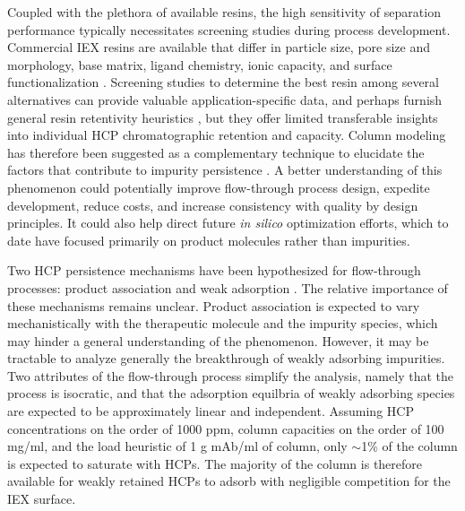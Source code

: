 \documentclass[preprint,review,12pt]{elsarticle}
\begin{document}
    Coupled with the plethora of available resins, the high sensitivity of separation performance typically necessitates screening studies during process development. Commercial IEX resins are available that differ in particle size, pore size and morphology, base matrix, ligand chemistry, ionic capacity, and surface functionalization \cite{Carta2010a, Schmidt-Traub2012}. Screening studies to determine the best resin among several alternatives can provide valuable application-specific data, and perhaps furnish general resin retentivity heuristics \cite{DePhillips2001}, but they offer limited transferable insights into individual HCP chromatographic retention and capacity. Column modeling has therefore been suggested as a complementary technique to elucidate the factors that contribute to impurity persistence \cite{Hasegawa2020_1, Hasegawa2020_2}. A better understanding of this phenomenon could potentially improve flow-through process design, expedite development, reduce costs, and increase consistency with quality by design principles. It could also help direct future \emph{in silico} optimization efforts, which to date have focused primarily on product molecules rather than impurities.

    Two HCP persistence mechanisms have been hypothesized for flow-through processes:  product association and weak adsorption \cite{Levy2016}. The relative importance of these mechanisms remains unclear. Product association is expected to vary mechanistically with the therapeutic molecule and the impurity species, which may hinder a general understanding of the phenomenon. However, it may be tractable to analyze generally the breakthrough of weakly adsorbing impurities. Two attributes of the flow-through process simplify the analysis, namely that the process is isocratic, and that the adsorption equilbria of weakly adsorbing species are expected to be approximately linear and independent. Assuming HCP concentrations on the order of 1000 ppm, column capacities on the order of 100 mg/ml, and the load heuristic of 1 g mAb/ml of column, only $\sim$1\% of the column is expected to saturate with HCPs. The majority of the column is therefore available for weakly retained HCPs to adsorb with negligible competition for the IEX surface.
\end{document}
